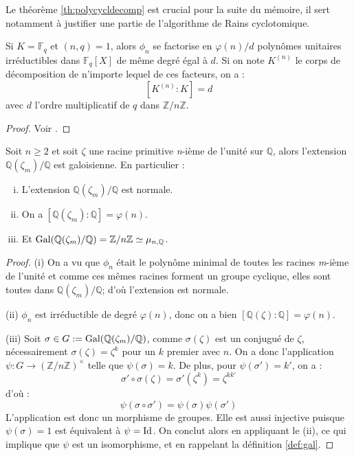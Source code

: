 \documentclass[a4paper]{article} %
\numberwithin{section}{part}
\numberwithin{equation}{section}
\newcommand\nroot[1]{\textit{#1}-ième}
\newcommand\zmodn[1]{\mathbb{Z}/#1\mathbb{Z}}
\newcommand\zmodninv[1]{(\mathbb{Z}/#1\mathbb{Z})^{\times}}
\newcommand\GF[1]{\mathbb{F}_{#1}}
\newcommand\QQ{\mathbb{Q}}
\begin{document}
Le théorème \ref{th:polycycldecomp} est crucial pour la suite du mémoire, il 
sert notamment à justifier une partie de l'algorithme de Rains cyclotomique.

\begin{thm}
\label{th:polycycldecomp}
Si $K = \GF{q}$ et $(n,q) = 1$, alors $\phi_n$ se factorise en $\varphi(n)/d$ 
polynômes unitaires irréductibles dans $\GF{q}[X]$ de même degré égal à $d$. Si
on note $K^{(n)}$ le corps de décomposition de n'importe lequel de ces facteurs,
on a :
\[[K^{(n)}:K] = d\]
avec $d$ l'ordre multiplicatif de $q$ dans $\zmodn{n}$.
\end{thm}
\begin{proof}
Voir \cite[th. 2.47]{LiNi1}.
\end{proof}

\begin{prop}
\label{prop:cyclgal}
Soit $n \geq 2$ et soit $\zeta$ une racine primitive \nroot{n} de l'unité sur 
$\QQ$, alors l'extension $\QQ(\zeta_m)/\QQ$ est galoisienne. En particulier :
\begin{enumerate}[(i)]
\item L'extension $\QQ(\zeta_m)/\QQ$ est normale.

\item On a $[\QQ(\zeta_m):\QQ] = \varphi(n)$.

\item Et $\textup{Gal}(\QQ(\zeta_m)/\QQ) = \zmodn{n} \simeq \mu_{n,\QQ}$.
\end{enumerate}
\end{prop}
\begin{proof}
(i) On a vu que $\phi_n$ était le polynôme minimal de toutes les racines 
\nroot{m} de l'unité et comme ces mêmes racines forment un groupe 
cyclique, elles sont toutes dans $\QQ(\zeta_m)/\QQ$; d'où l'extension est
normale.\par
(ii) $\phi_n$ est irréductible de degré $\varphi(n)$, donc on a bien
$[\QQ(\zeta):\QQ] = \varphi(n)$.\par
(iii) Soit $\sigma\in G := \textup{Gal}(\QQ(\zeta_m)/\QQ)$, comme 
$\sigma(\zeta)$ est un conjugué de $\zeta$, nécessairement $\sigma(\zeta) = 
\zeta^k$ pour un $k$ premier avec $n$. On a donc l'application $\psi : G \to 
\zmodninv{n}$ telle que $\psi(\sigma) = k$. De plus, pour $\psi(\sigma') = k'$, 
on a :
\[\sigma'\circ\sigma(\zeta) = \sigma'(\zeta^k) = \zeta^{kk'}\]
d'où :
\[\psi(\sigma\circ\sigma') = \psi(\sigma)\psi(\sigma')\]
L'application est donc un morphisme de groupes. Elle est aussi injective puisque
$\psi(\sigma) = 1$ est équivalent à $\psi = \textup{Id}$. On conclut alors en
appliquant le (ii), ce qui implique que $\psi$ est un isomorphisme, et en 
rappelant la définition \ref{def:gal}.
\end{proof}
\end{document}
